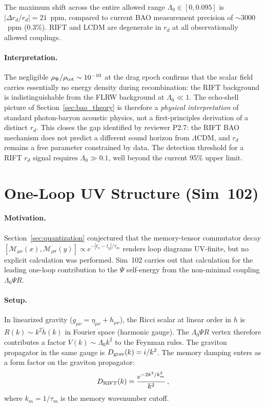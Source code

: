 \documentclass[12pt,a4paper]{article}
\begin{document}
The maximum shift across the entire allowed range $\Lambda_0 \in [0, 0.095]$
is $|\Delta r_d / r_d| = 21$~ppm, compared to current BAO measurement
precision of $\sim 3000$~ppm (0.3\%). RIFT and LCDM are degenerate in
$r_d$ at all observationally allowed couplings.

\paragraph{Interpretation.}
The negligible $\rho_\Psi/\rho_{\rm tot} \sim 10^{-10}$ at the drag epoch
confirms that the scalar field carries essentially no energy density during
recombination: the RIFT background is indistinguishable from the FLRW
background at $\Lambda_0 \ll 1$. The echo-shell picture of
Section~\ref{sec:bao_theory} is therefore a \emph{physical interpretation}
of standard photon-baryon acoustic physics, not a first-principles derivation
of a distinct $r_d$. This closes the gap identified by reviewer P2.7:
the RIFT BAO mechanism does not predict a different sound horizon from
$\Lambda$CDM, and $r_d$ remains a free parameter constrained by data.
The detection threshold for a RIFT $r_d$ signal requires $\Lambda_0 \gg 0.1$,
well beyond the current 95\% upper limit.

\section{One-Loop UV Structure (Sim~102)}
\label{sec:sim102}

\paragraph{Motivation.}
Section~\ref{sec:quantization} conjectured that the memory-tensor commutator
decay $[\mathcal{M}_{\mu\nu}(x), \mathcal{M}_{\rho\sigma}(y)] \propto
e^{-|t_x-t_y|/\tau_m}$ renders loop diagrams UV-finite, but no explicit
calculation was performed. Sim~102 carries out that calculation for the
leading one-loop contribution to the $\Psi$ self-energy from the
non-minimal coupling $\Lambda_0\Psi R$.

\paragraph{Setup.}
In linearized gravity ($g_{\mu\nu} = \eta_{\mu\nu} + h_{\mu\nu}$), the
Ricci scalar at linear order in $h$ is $R(k) \sim k^2 \tilde{h}(k)$ in
Fourier space (harmonic gauge). The $\Lambda_0\Psi R$ vertex therefore
contributes a factor $V(k) \sim \Lambda_0 k^2$ to the Feynman rules.
The graviton propagator in the same gauge is $D_{\rm grav}(k) = i/k^2$.
The memory damping enters as a form factor on the graviton propagator:
\begin{equation}
D_{\rm RIFT}(k) = \frac{e^{-2k^2/k_m^2}}{k^2}\,,
\label{eq:RIFT_graviton_prop}
\end{equation}
where $k_m = 1/\tau_m$ is the memory wavenumber cutoff.
\end{document}
